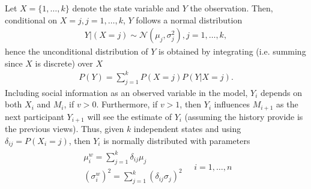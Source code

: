 \documentclass[9pt,twoside,lineno]{pnas-new}
\begin{document}
Let $X=\{1,\dots,k\}$ denote the state variable and $Y$ the observation. Then, conditional on $X=j, j=1,\dots,k$, $Y$ follows a normal distribution
\begin{align*}
	Y|(X=j)  \sim \mathcal{N} (\mu_j,\sigma^2_j), j=1,\dots,k,
\end{align*}
hence the unconditional distribution of $Y$ is obtained by integrating (i.e. summing since $X$ is discrete) over $X$
\begin{align*}
	P(Y) = \sum_{j=1}^k P(X=j)P(Y|X=j).
\end{align*}
Including social information as an observed variable in the model, $Y_i$ depends on both $X_i$ and $M_i$, if $v>0$. Furthermore, if $v>1$, then $Y_i$ influences $M_{i+1}$ as the next participant $Y_{i+1}$ will see the estimate of $Y_i$ (assuming the history provide is the previous views).
%
%
%
%
Thus, given $k$ independent states and using $\delta_{ij} = P(X_i=j)$, then $Y_i$ is normally distributed with parameters
\begin{align}
\begin{array}{l}
	\mu^w_i = \sum_{j=1}^k \delta_{ij} \mu_j \\
	(\sigma^w_i)^2 = \sum_{j=1}^k \left(\delta_{ij} \sigma_j\right)^2
\end{array}
\quad i=1,\dots,n \label{eq: weighted Gaussian parameters}
\end{align}
\end{document}
